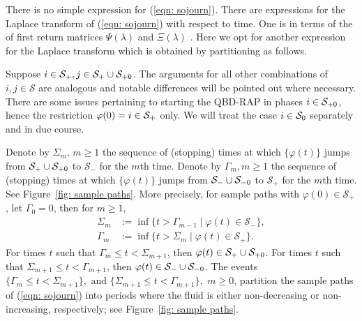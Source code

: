 There is no simple expression for (\ref{eqn: sojourn}). There are expressions for the Laplace transform of (\ref{eqn: sojourn}) with respect to time. One is in terms of the of first return matrices \(\Psi(\lambda)\) and \(\Xi(\lambda)\) \citep{bean2009}. Here we opt for another expression for the Laplace transform which is obtained by partitioning as follows.

Suppose \(i\in\mathcal{S}_+,j\in\mathcal S_+\cup\mathcal S_{+0}\). The arguments for all other combinations of \(i,j\in\mathcal S\) are analogous and notable differences will be pointed out where necessary. There are some issues pertaining to starting the QBD-RAP in phases \(i\in\mathcal{S}_{+0}\), hence the restriction \(\varphi(0)=i\in\mathcal{S}_+\) only. We will treat the case \(i\in\mathcal{S}_0\) separately and in due course.

Denote by \(\Sigma_m,\, m\geq 1\) the sequence of (stopping) times at which \(\{\varphi(t)\}\) jumps from \(\mathcal S_+\cup\mathcal{S}_{+0}\) to \(\mathcal S_- \) for the \(m\)th time. Denote by \(\Gamma_m, m\geq 1\) the sequence of (stopping) times at which \(\{\varphi(t)\}\) jumps from \(\mathcal S_-\cup\mathcal{S}_{-0}\) to \(\mathcal S_+\) for the \(m\)th time. See Figure~\ref{fig: sample paths}. More precisely, for sample paths with \(\varphi(0)\in\mathcal S_+\), let \(\Gamma_0=0\), then for \(m\geq 1\), 
\begin{align}
	\Sigma_m &:=\inf\{t > \Gamma_{m-1} \mid \varphi(t)\in\mathcal S_-\}, 
	\\ \Gamma_m &:=\inf\{t > \Sigma_{m} \mid \varphi(t)\in\mathcal S_+\}.
\end{align}
For times \(t\) such that \(\Gamma_m\leq t<\Sigma_{m+1}\), then \(\varphi(t)\in\mathcal S_+\cup\mathcal{S}_{+0}\). For times \(t\) such that \(\Sigma_{m+1}\leq t< \Gamma_{m+1}\), then \(\varphi(t)\in\mathcal S_-\cup\mathcal{S}_{-0}\). The events \(\{\Gamma_m\leq t< \Sigma_{m+1}\} , \mbox{ and } \{\Sigma_{m+1}\leq t< \Gamma_{m+1}\}, \) \(m\geq 0\), partition the sample paths of (\ref{eqn: sojourn}) into periods where the fluid is either non-decreasing or non-increasing, respectively; see Figure~\ref{fig: sample paths}.
